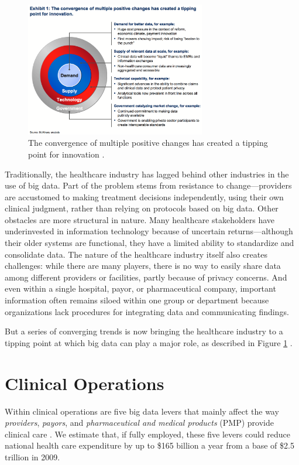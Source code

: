 \documentclass[twocolumn]{article}
\begin{document}
\begin{figure}[htb]
        \centering
        \includegraphics[width=0.7\textwidth]{convergence.png}
        \caption{The convergence of multiple positive changes has created a tipping point for innovation  \cite{Groves:2013}.}
        \label{fig:convergence}
\end{figure}

Traditionally, the healthcare industry has lagged behind other industries in the use of big data. Part of the problem stems from resistance to change—providers are accustomed to making treatment decisions independently, using their own clinical judgment, rather than relying on protocols based on big data. Other obstacles are more structural in nature. 
Many healthcare stakeholders have underinvested in information technology because of uncertain returns—although their older systems are functional, they have a limited ability to standardize and consolidate data. The nature of the healthcare industry itself also creates challenges: while there are many players, there is no way to easily share data among different providers or facilities, partly because of privacy concerns. And even within a single hospital, payor, or pharmaceutical company, important information often remains siloed within one group or department because organizations lack procedures for integrating data and communicating findings.

But a series of converging trends is now bringing the healthcare industry to a tipping point at which big data can play a major role, as described in Figure \ref{fig:convergence} . 

\section{Clinical Operations}
Within clinical operations are five big data levers that mainly affect the way \textit{providers}, \textit{payors}, and \textit{pharmaceutical and medical products} (PMP) provide clinical care \cite{Manyika:2011}. We estimate that, if fully employed, these five levers could reduce national health care expenditure by up to \$165 billion a year from a base of \$2.5 trillion in 2009.
\end{document}
